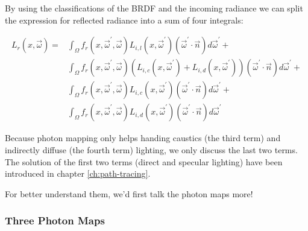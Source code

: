 By using the classifications of the BRDF and the incoming radiance we can split the expression for reflected radiance into a sum of four integrals:

\begin{equation}\label{e:four-componenets-equation}
\begin{aligned}
	L_r(x,\vec{\omega})=&\int_\Omega f_r(x,\vec{\omega}^{'},\vec{\omega}) L_{i,l}(x,\vec{\omega}^{'}) (\vec{\omega}^{'}\cdot\vec{n}) d\vec{\omega}^{'}+ \\
	&\int_\Omega f_r(x,\vec{\omega}^{'},\vec{\omega}) (L_{i,c}(x,\vec{\omega}^{'})+L_{i,d}(x,\vec{\omega}^{'})) (\vec{\omega}^{'}\cdot\vec{n}) d\vec{\omega}^{'}+ \\
	&\int_\Omega f_r(x,\vec{\omega}^{'},\vec{\omega}) L_{i,c}(x,\vec{\omega}^{'}) (\vec{\omega}^{'}\cdot\vec{n}) d\vec{\omega}^{'}+ \\
	&\int_\Omega f_r(x,\vec{\omega}^{'},\vec{\omega}) L_{i,d}(x,\vec{\omega}^{'}) (\vec{\omega}^{'}\cdot\vec{n}) d\vec{\omega}^{'}
\end{aligned}
\end{equation}

Because photon mapping only helps handing caustics (the third term) and indirectly diffuse (the fourth term) lighting, we only discuss the last two terms. The solution of the first two terms (direct and specular lighting) have been introduced in chapter \ref{ch:path-tracing}.

For better understand them, we'd first talk the photon maps more!


\subsubsection{Three Photon Maps}

